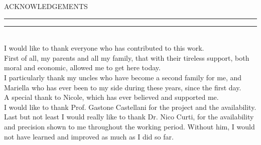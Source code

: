 \documentclass{standalone}
\begin{document}
\markboth{}{}
\begin{center}
    
	{{\Large{\textsc{ACKNOWLEDGEMENTS}}}} 
\rule[0.1cm]{15.8cm}{0.1mm}
\rule[0.5cm]{15.8cm}{0.6mm}
\\\vspace{3mm}
I would like to thank everyone who has contributed to this work.
\\
First of all, my parents and all my family, that with their tireless support, both moral and economic, allowed me to get here today.\\
I particularly thank my uncles who have become a second family for me, and Mariella who has ever been to my side during these years, since the first day.\\
A special thank to Nicole, which has ever believed and supported me.   \\
I would like to thank Prof. Gastone Castellani for the project and the availability.\\
Last but not least I would really like to thank Dr. Nico Curti, for the availability and precision shown to me throughout the working period. Without him, I would not have learned and improved as much as I did so far.

\end{center}
\end{document}
